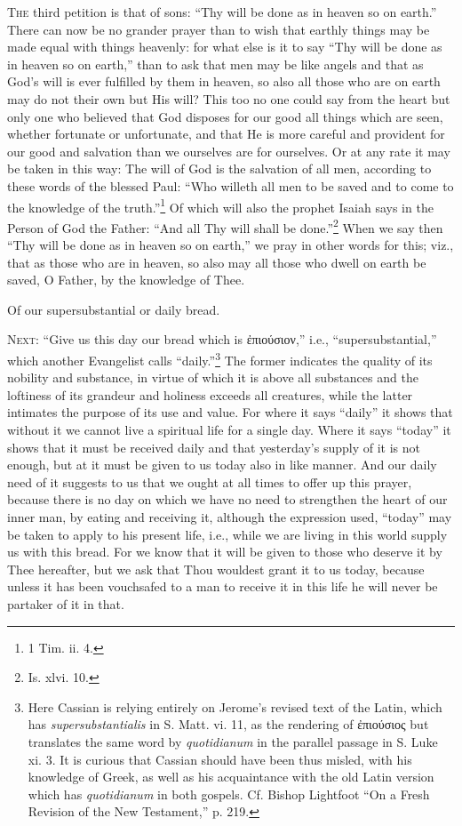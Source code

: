 \textsc{The} third petition is that of sons: “Thy will be done as in heaven so on earth.” There can now be no grander prayer than to wish that earthly things may be made equal with things heavenly: for what else is it to say “Thy will be done as in heaven so on earth,” than to ask that men may be like angels and that as God’s will is ever fulfilled by them in heaven, so also all those who are on earth may do not their own but His will? This too no one could say from the heart but only one who believed that God disposes for our good all things which are seen, whether fortunate or unfortunate, and that He is more careful and provident for our good and salvation than we ourselves are for ourselves. Or at any rate it may be taken in this way: The will of God is the salvation of all men, according to these words of the blessed Paul: “Who willeth all men to be saved and to come to the knowledge of the truth.”\footnote{1 Tim. ii. 4.} Of which will also the prophet Isaiah says in the Person of God the Father: “And all Thy will shall be done.”\footnote{Is. xlvi. 10.} When we say then “Thy will be done as in heaven so on earth,” we pray in other words for this; viz., that as those who are in heaven, so also may all those who dwell on earth be saved, O Father, by the knowledge of Thee.


Of our supersubstantial or daily bread.

\textsc{Next}: “Give us this day our bread which is \textgreek{ἐπιούσιον},” i.e., “supersubstantial,” which another Evangelist calls “daily.”\footnote{Here Cassian is relying entirely on Jerome’s revised text of the Latin, which has \emph{supersubstantialis} in S. Matt. vi. 11, as the rendering of \textgreek{ἐπιούσιος} but translates the same word by \emph{quotidianum} in the parallel passage in S. Luke xi. 3. It is curious that Cassian should have been thus misled, with his knowledge of Greek, as well as his acquaintance with the old Latin version which has \emph{quotidianum} in both gospels. Cf. Bishop Lightfoot “On a Fresh Revision of the New Testament,” p. 219.} The former indicates the quality of its nobility and substance, in virtue of which it is above all substances and the loftiness of its grandeur and holiness exceeds all creatures, while the latter intimates the purpose of its use and value. For where it says “daily” it shows that without it we cannot live a spiritual life for a single day. Where it says “today” it shows that it must be received daily and that yesterday’s supply of it is not enough, but at it must be given to us today also in like manner. And our daily need of it suggests to us that we ought at all times to offer up this prayer, because there is no day on which we have no need to strengthen the heart of our inner man, by eating and receiving it, although the expression used, “today” may be taken to apply to his present life, i.e., while we are living in this world supply us with this bread. For we know that it will be given to those who deserve it by Thee hereafter, but we ask that Thou wouldest grant it to us today, because unless it has been vouchsafed to a man to receive it in this life he will never be partaker of it in that.

